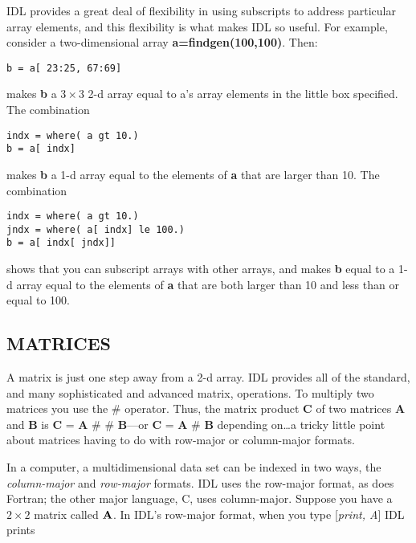 \documentclass[psfig,preprint]{aastex}
\begin{document}
	IDL provides a great deal of flexibility in using subscripts to
address particular array elements, and this flexibility is what makes
IDL so useful. For example, consider a two-dimensional array {\bf
a=findgen(100,100)}. Then:

\begin{verbatim}
b = a[ 23:25, 67:69]
\end{verbatim}

\noindent makes {\bf b} a $3 \times 3$ 2-d array equal to a's 
array elements in the little box specified. The combination

\begin{verbatim}
indx = where( a gt 10.)
b = a[ indx]
\end{verbatim}

\noindent makes {\bf b} a 1-d array equal to the elements of {\bf a}
that are larger than 10. The combination

\begin{verbatim}
indx = where( a gt 10.)
jndx = where( a[ indx] le 100.)
b = a[ indx[ jndx]]
\end{verbatim}

\noindent shows that you can subscript arrays with other arrays, and
makes {\bf b} equal to a 1-d array equal to the elements of {\bf a} that
are both larger than 10 and less than or equal to 100.

\subsection{MATRICES}

        A matrix is just one step away from a 2-d array. IDL provides
all of the standard, and many sophisticated and advanced matrix,
operations. To multiply two matrices you use the $\#$ operator. Thus, the
matrix product {\bf C} of two matrices {\bf A} and {\bf B} is {\bf C} =
{\bf A} \# \# {\bf B}---or {\bf C} = {\bf A} \# {\bf B} depending on\dots a
tricky little point about matrices having to do with row-major or
column-major formats. 

        In a computer, a multidimensional data set can be indexed in two
ways, the {\it column-major} and {\it row-major} formats.  IDL uses the
row-major format, as does Fortran; the other major language, C, uses
column-major.  Suppose you have a $2 \times 2$ matrix called ${\bf A}$.
In IDL's row-major format, when you type [{\it print, A}] IDL prints
\end{document}
